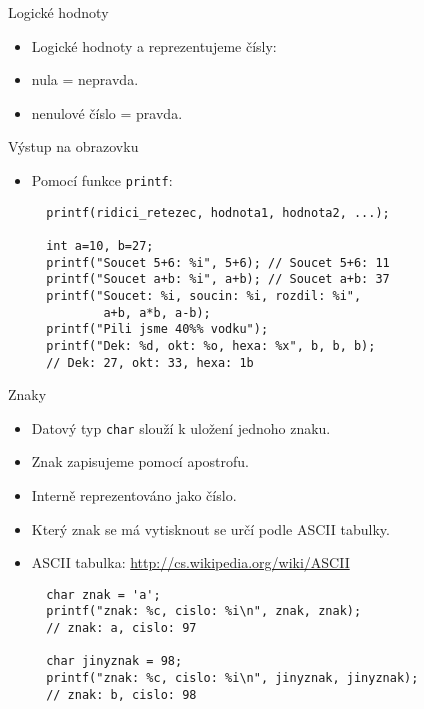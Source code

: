 \documentclass{beamer}
\newenvironment{itemizex}%
  {\large \begin{itemize}%
    \setlength{\itemsep}{8pt}%
    \setlength{\parskip}{8pt}}%
  {\end{itemize}}
\begin{document}
\begin{frame}[t,fragile]{Logické hodnoty}
\begin{itemizex}
  \item Logické hodnoty  a  reprezentujeme čísly:
  \item nula = nepravda.
  \item nenulové číslo = pravda.
\end{itemizex}
\end{frame}


\begin{frame}[t,fragile]{Výstup na obrazovku}
\begin{itemizex}
  \item Pomocí funkce \texttt{printf}:
  \begin{verbatim} 
  printf(ridici_retezec, hodnota1, hodnota2, ...);

  int a=10, b=27;
  printf("Soucet 5+6: %i", 5+6); // Soucet 5+6: 11
  printf("Soucet a+b: %i", a+b); // Soucet a+b: 37
  printf("Soucet: %i, soucin: %i, rozdil: %i", 
          a+b, a*b, a-b);
  printf("Pili jsme 40%% vodku");
  printf("Dek: %d, okt: %o, hexa: %x", b, b, b);
  // Dek: 27, okt: 33, hexa: 1b
  \end{verbatim}
\end{itemizex}
\end{frame}


\begin{frame}[t,fragile]{Znaky}
\begin{itemize}
  \item Datový typ \texttt{char} slouží k uložení jednoho znaku.
  \item Znak zapisujeme pomocí apostrofu.
  \item Interně reprezentováno jako číslo.
  \item Který znak se má vytisknout se určí podle ASCII tabulky.
  \item ASCII tabulka: \url{http://cs.wikipedia.org/wiki/ASCII}
  \begin{verbatim} 
  char znak = 'a';
  printf("znak: %c, cislo: %i\n", znak, znak);
  // znak: a, cislo: 97

  char jinyznak = 98;
  printf("znak: %c, cislo: %i\n", jinyznak, jinyznak);
  // znak: b, cislo: 98
  \end{verbatim}
\end{itemize}
\end{frame}
\end{document}
